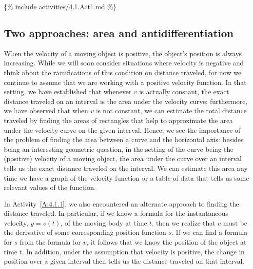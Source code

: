 \{\% include activities/4.1.Act1.md \%\}

\subsection*{Two approaches: area and antidifferentiation}

When the velocity of a moving object is positive, the object's position is always increasing.  While we will soon consider situations where velocity is negative and think about the ramifications of this condition on distance traveled, for now we continue to assume that we are working with a positive velocity function.  In that setting, we have established that whenever $v$ is actually constant, the exact distance traveled on an interval is the area under the velocity curve; furthermore, we have observed that when $v$ is not constant, we can estimate the total distance traveled by finding the areas of rectangles that help to approximate the area under the velocity curve on the given interval.  Hence, we see the importance of the problem of finding the area between a curve and the horizontal axis:  besides being an interesting geometric question, in the setting of the curve being the (positive) velocity of a moving object, the area under the curve over an interval tells us the exact distance traveled on the interval.  We can estimate this area any time we have a graph of the velocity function or a table of data that tells us some relevant values of the function.

In Activity~\ref{A:4.1.1}, we also encountered an alternate approach to finding the distance traveled.  In particular, if we know a formula for the instantaneous velocity, $y = v(t)$, of the moving body at time $t$, then we realize that $v$ must be the derivative of some corresponding position function $s$.  If we can find a formula for $s$ from the formula for $v$, it follows that we know the position of the object at time $t$.  In addition, under the assumption that velocity is positive, the change in position over a given interval then tells us the distance traveled on that interval.  

